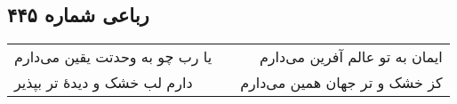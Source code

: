 \begin{center}
\section*{رباعی شماره ۴۴۵}
\label{sec:sh445}
\begin{longtable}{l p{0.5cm} r}
یا رب چو به وحدتت یقین می‌دارم
&&
ایمان به تو عالم آفرین می‌دارم
\\
دارم لب خشک و دیدهٔ تر بپذیر
&&
کز خشک و تر جهان همین می‌دارم
\\
\end{longtable}
\end{center}
